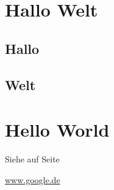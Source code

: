 \documentclass[12pt,ngerman]{scrartcl}
\begin{document}
\tableofcontents

\section{Hallo Welt}\label{sec:hello}
\subsection{Hallo}
\blindtext[10]

\subsection{Welt}
\blindtext[10]


\section{Hello World}

Siehe  auf Seite \pageref{sec:hello}

\url{www.google.de}
\end{document}
